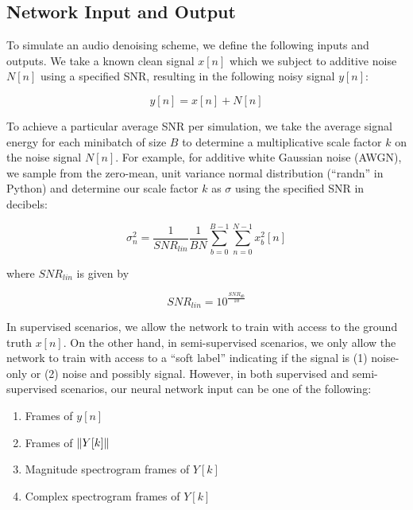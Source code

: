 
\subsection{Network Input and Output}
To simulate an audio denoising scheme, we define the following inputs and outputs. We take a known clean signal $x[n]$ which we subject to additive noise $N[n]$ using a specified SNR, resulting in the following noisy signal $y[n]$:

\begin{equation}
y[n] = x[n] + N[n]
\end{equation}

To achieve a particular average SNR per simulation, we take the average signal energy for each minibatch of size $B$ to determine a multiplicative scale factor $k$ on the noise signal $N[n]$. For example, for additive white Gaussian noise (AWGN), we sample from the zero-mean, unit variance normal distribution (``randn'' in Python) and determine our scale factor $k$ as $\sigma$ using the specified SNR in decibels:

\begin{equation}\label{eq:siggy}
\sigma_n^{2} = \dfrac{1}{SNR_{lin}}\dfrac{1}{BN}\sum_{b=0}^{B-1} \sum_{n=0}^{N-1} x_{b}^{2}[n]
\end{equation}

where $SNR_{lin}$ is given by

\begin{equation}
SNR_{lin} = 10^{\frac{SNR_{db}}{10}}
\end{equation}

In supervised scenarios, we allow the network to train with access to the ground truth $x[n]$. On the other hand, in semi-supervised scenarios, we only allow the network to train with access to a ``soft label'' indicating if the signal is (1) noise-only or (2) noise and possibly signal. \cite{stow} However, in both supervised and semi-supervised scenarios, our neural network input can be one of the following:

\begin{enumerate}
    \item Frames of $y[n]$
    \item Frames of $\lVert Y[k]\rVert$
    \item Magnitude spectrogram frames of $Y[k]$
    \item Complex spectrogram frames of $Y[k]$
\end{enumerate}


